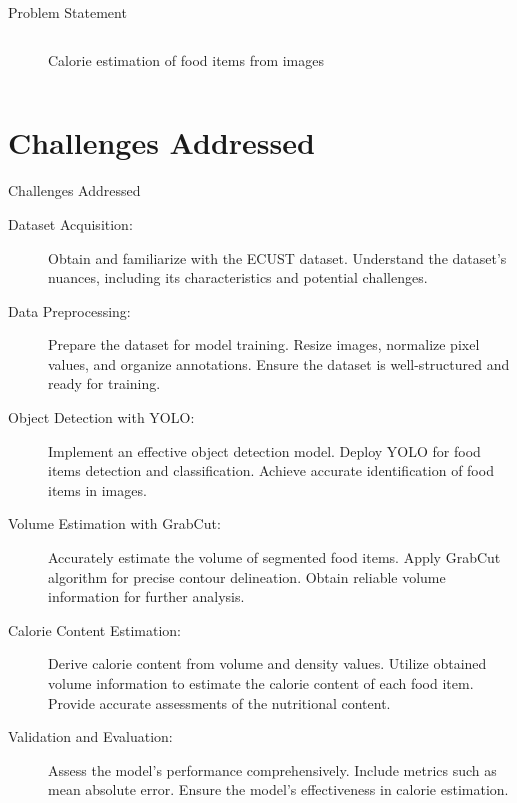 \documentclass{beamer}
\begin{document}
\begin{frame}{Problem Statement}
\begin{columns}
\begin{figure}
				\caption{Calorie estimation of food items from images\cite{liang}}
			\end{figure}
		\end{columns}
	\end{frame}
	
	\section{Challenges Addressed}
	\begin{frame}{Challenges Addressed}\footnotesize
		\begin{block}{}
			\begin{description}
				\item[Dataset Acquisition:] Obtain and familiarize with the ECUST dataset. Understand the dataset's nuances, including its characteristics and potential challenges.
				\item[Data Preprocessing:] Prepare the dataset for model training. Resize images, normalize pixel values, and organize annotations. Ensure the dataset is well-structured and ready for training.\pause
				\item[Object Detection with YOLO:] Implement an effective object detection model. Deploy YOLO for food items detection and classification. Achieve accurate identification of food items in images.
				\item[Volume Estimation with GrabCut:] Accurately estimate the volume of segmented food items. Apply GrabCut algorithm for precise contour delineation. Obtain reliable volume information for further analysis.\pause
				\item[Calorie Content Estimation:]  Derive calorie content from volume and density values. Utilize obtained volume information to estimate the calorie content of each food item. Provide accurate assessments of the nutritional content.
				\item[Validation and Evaluation:] Assess the model's performance comprehensively. Include metrics such as mean absolute error. Ensure the model's effectiveness in calorie estimation.			
			\end{description}
		\end{block}
	\end{frame}
	
\end{document}

